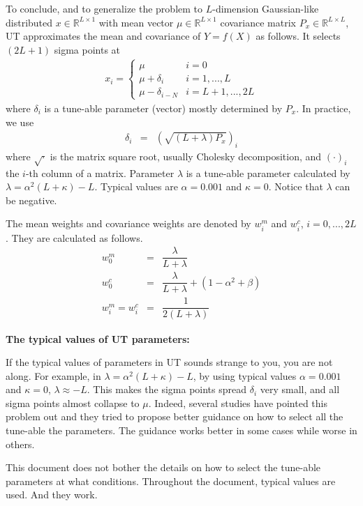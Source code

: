 To conclude, and to generalize the problem to $L$-dimension Gaussian-like distributed $x\in\mathbb{R}^{L\times 1}$ with mean vector $\mu\in\mathbb{R}^{L\times 1}$ covariance matrix $P_x\in\mathbb{R}^{L\times L}$, UT approximates the mean and covariance of $Y=f(X)$ as follows. It selects $(2L+1)$ sigma points at
\begin{eqnarray}
	x_i = \left\{\begin{array}{ll}
		\mu & i=0 \\
		\mu + \delta_i & i=1,...,L \\
		\mu - \delta_{i-N} & i = L + 1, ..., 2L
	\end{array}\right. \label{eq:utx} 
\end{eqnarray} 
where $\delta_i$ is a tune-able parameter (vector) mostly determined by $P_x$. In practice, we use
\begin{eqnarray}
	\delta_i &=& \left(\sqrt{(L+\lambda)P_x}\right)_i \nonumber
\end{eqnarray}
where $\sqrt{\cdot}$ is the matrix square root, usually Cholesky decomposition, and $(\cdot)_i$ the $i$-th column of a matrix. Parameter $\lambda$ is a tune-able parameter calculated by $\lambda = \alpha^2(L+\kappa)-L$. Typical values are $\alpha=0.001$ and $\kappa = 0$. Notice that $\lambda$ can be negative.

The mean weights and covariance weights are denoted by $w_i^m$ and $w_i^c$, $i=0,...,2L$. They are calculated as follows.
\begin{eqnarray}
	w_0^m &=& \dfrac{\lambda}{L + \lambda} \label{eq:utwm0}  \\
	w_0^c &=& \dfrac{\lambda}{L + \lambda} + \left(1-\alpha^2+\beta \right) \label{eq:utwc0} \\
	w_i^m = w_i^c &=& \dfrac{1}{2(L+\lambda)} \label{eq:utwmc}
\end{eqnarray}

\begin{mdframed}
	\noindent \textbf{The typical values of UT parameters:}
	
	If the typical values of parameters in UT sounds strange to you, you are not along. For example, in $\lambda = \alpha^2(L+\kappa)-L$, by using typical values $\alpha=0.001$ and $\kappa=0$, $\lambda \approx -L$. This makes the sigma points spread $\delta_i$ very small, and all sigma points almost collapse to $\mu$. Indeed, several studies have pointed this problem out and they tried to propose better guidance on how to select all the tune-able the parameters. The guidance works better in some cases while worse in others.
	
	This document does not bother the details on how to select the tune-able parameters at what conditions. Throughout the document, typical values are used. And they work.
\end{mdframed}

